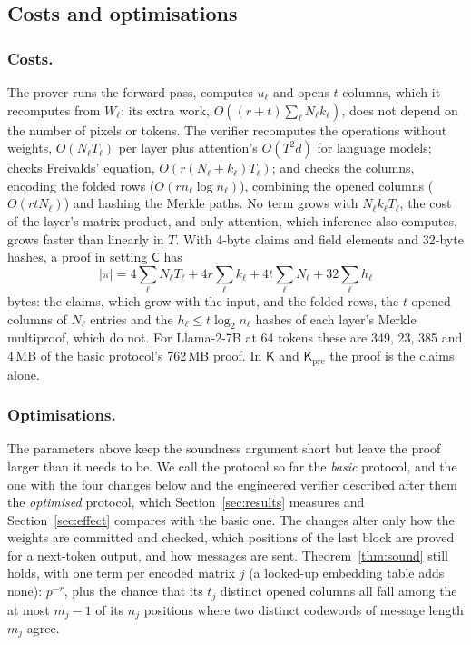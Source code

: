 \documentclass[sigconf,nonacm]{acmart}
\newcommand{\Kpre}{\mathsf{K}_{\mathrm{pre}}}
\newcommand{\sC}{\mathsf{C}}
\newcommand{\sK}{\mathsf{K}}
\begin{document}
\subsection{Costs and optimisations}
\label{sec:opt}

\subsubsection{\textbf{Costs.}} The prover runs the forward pass, computes $u_\ell$ and opens $t$ columns, which it
recomputes from $W_\ell$; its extra work, $O((r+t)\sum_\ell N_\ell k_\ell)$, does not depend on the
number of pixels or tokens. The verifier recomputes the operations without weights, $O(N_\ell T_\ell)$ per layer plus
attention's $O(T^2d)$ for language models; checks Freivalds' equation, $O(r(N_\ell+k_\ell)T_\ell)$;
and checks the columns, encoding the folded rows ($O(rn_\ell\log n_\ell)$), combining the opened
columns ($O(rtN_\ell)$) and hashing the Merkle paths. No term grows with $N_\ell k_\ell T_\ell$, the
cost of the layer's matrix product, and only attention, which inference also computes, grows faster
than linearly in $T$. With 4-byte claims and field elements and 32-byte hashes, a proof in
setting $\sC$ has
\begin{equation}
  |\pi| = 4\sum_\ell N_\ell T_\ell + 4r\sum_\ell k_\ell + 4t\sum_\ell N_\ell + 32\sum_\ell h_\ell
  \label{eq:size}
\end{equation}
bytes: the claims, which grow with the input, and the folded rows, the $t$ opened columns of $N_\ell$
entries and the $h_\ell \le t\log_2 n_\ell$ hashes of each layer's Merkle multiproof, which do not.
For Llama-2-7B at 64 tokens these are 349, 23, 385 and 4\,MB of the basic protocol's 762\,MB
proof. In $\sK$ and
$\Kpre$ the proof is the claims alone.

\subsubsection{\textbf{Optimisations.}} The parameters above keep the soundness argument short but leave the proof
larger than it needs to be. We call the protocol so far the \emph{basic} protocol, and the one with
the four changes below and the engineered verifier described after them the \emph{optimised}
protocol, which Section~\ref{sec:results} measures and Section~\ref{sec:effect} compares with the
basic one. The changes alter only how the weights are committed and checked, which positions of
the last block are proved for a next-token output, and how messages are sent. Theorem~\ref{thm:sound}
still holds, with one term per encoded matrix $j$ (a looked-up embedding table adds none): $p^{-r}$,
plus the chance that its $t_j$ distinct opened columns all fall among the at most $m_j-1$ of its
$n_j$ positions where two distinct codewords of message length $m_j$ agree.
\end{document}
